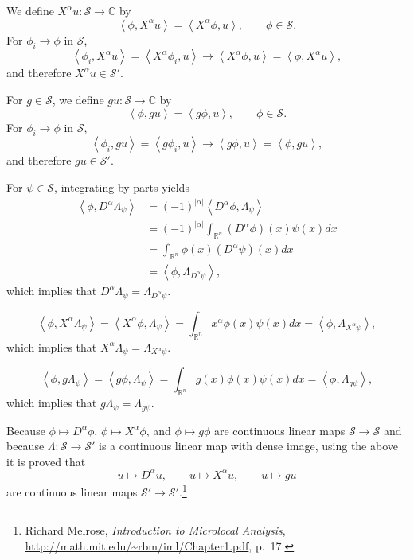 \documentclass{article}
\newcommand{\inner}[2]{\left\langle #1, #2 \right\rangle}
\theoremstyle{definition}
\begin{document}
We define $X^\alpha u:\mathscr{S} \to \mathbb{C}$ by
\[
\inner{\phi}{X^\alpha u} = \inner{X^\alpha \phi}{u},\qquad \phi \in \mathscr{S}.
\]
For $\phi_i \to \phi$ in $\mathscr{S}$,
\[
\inner{\phi_i}{X^\alpha u} = \inner{X^\alpha \phi_i}{u} \to 
\inner{X^\alpha \phi}{u}
=\inner{\phi}{X^\alpha u},
\]
and therefore $X^\alpha u \in \mathscr{S}'$. 

For $g \in \mathscr{S}$, we define $g u:\mathscr{S} \to \mathbb{C}$ by
\[
\inner{\phi}{g u} = \inner{g \phi}{u},\qquad \phi \in \mathscr{S}.
\]
For $\phi_i \to \phi$ in $\mathscr{S}$,
\[
\inner{\phi_i}{g u}
=\inner{g \phi_i}{u}
\to \inner{g \phi}{u}
=\inner{\phi}{g u},
\]
and therefore $g u \in \mathscr{S}'$. 


 For $\psi \in \mathscr{S}$,
integrating by parts yields
\begin{align*}
\inner{\phi}{D^\alpha \Lambda_\psi}
&=
(-1)^{|\alpha|} \inner{D^\alpha \phi}{\Lambda_\psi}\\
&=(-1)^{|\alpha|} \int_{\mathbb{R}^n} (D^\alpha \phi)(x) \psi(x) dx\\
&=\int_{\mathbb{R}^n} \phi(x) (D^\alpha \psi)(x) dx\\
&=\inner{\phi}{\Lambda_{D^\alpha \psi}},
\end{align*}
which implies that $D^\alpha \Lambda_\psi = \Lambda_{D^\alpha \psi}$.

\[
\inner{\phi}{X^\alpha \Lambda_\psi}
=\inner{X^\alpha \phi}{\Lambda_\psi}
=\int_{\mathbb{R}^n} x^\alpha \phi(x) \psi(x) dx
=\inner{\phi}{\Lambda_{X^\alpha \psi}},
\]
which implies that $X^\alpha \Lambda_\psi = \Lambda_{X^\alpha \psi}$. 


\[
\inner{\phi}{g \Lambda_\psi}
=\inner{g\phi}{\Lambda_\psi}
=\int_{\mathbb{R}^n} g(x) \phi(x) \psi(x) dx
=\inner{\phi}{\Lambda_{g \psi}},
\]
which implies that $g\Lambda_\psi = \Lambda_{g \psi}$. 

Because $\phi \mapsto D^\alpha \phi$, $\phi \mapsto X^\alpha \phi$, and $\phi \mapsto g\phi$ are continuous
linear maps
$\mathscr{S} \to \mathscr{S}$ and because $\Lambda:\mathscr{S} \to \mathscr{S}'$
is a continuous linear map with dense image, using the above it is proved that
\[
u \mapsto D^\alpha u,\qquad u \mapsto X^\alpha u,\qquad u \mapsto gu
\]
are continuous linear maps $\mathscr{S}' \to \mathscr{S}'$.\footnote{Richard Melrose,
{\em Introduction to Microlocal Analysis},
\url{http://math.mit.edu/~rbm/iml/Chapter1.pdf},
p.~17.}
\end{document}
